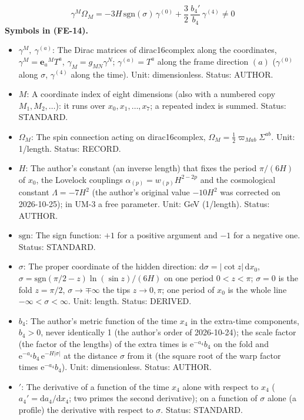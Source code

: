 \documentclass[
  10pt,
]{article}
\providecommand{\tightlist}{%
  \setlength{\itemsep}{0pt}\setlength{\parskip}{0pt}}
\begin{document}
\[
\gamma^M\Omega_M = -3H\,\mathrm{sgn}(\sigma)\,\gamma^{(0)} + \frac32\,\frac{b_4'}{b_4}\,\gamma^{(4)} \ne 0 \tag{FE-14}
\] \textbf{Symbols in (FE-14).}

\begin{itemize}
\tightlist
\item
  \(\gamma^M,\ \gamma^{(a)}\): The Dirac matrices of dirac16complex
  along the coordinates, \(\gamma^M = \mathbf{e}_a{}^MT^a\),
  \(\gamma_M = g_{MN}\gamma^N\); \(\gamma^{(a)} = T^a\) along the frame
  direction \((a)\) (\(\gamma^{(0)}\) along \(\sigma\), \(\gamma^{(4)}\)
  along the time). Unit: dimensionless. Status: AUTHOR.
\item
  \(M\): A coordinate index of eight dimensions (also with a numbered
  copy \(M_1, M_2, \dots\)): it runs over \(x_0, x_1, \dots, x_7\); a
  repeated index is summed. Status: STANDARD.
\item
  \(\Omega_M\): The spin connection acting on dirac16complex,
  \(\Omega_M = \frac12\varpi_{Mab}\Sigma^{ab}\). Unit: 1/length. Status:
  RECORD.
\item
  \(H\): The author's constant (an inverse length) that fixes the period
  \(\pi/(6H)\) of \(x_0\), the Lovelock couplings
  \(\alpha_{(p)} = w_{(p)}H^{2-2p}\) and the cosmological constant
  \(\Lambda = -7H^2\) (the author's original value \(-10H^2\) was
  corrected on 2026-10-25); in UM-3 a free parameter. Unit: GeV
  (1/length). Status: AUTHOR.
\item
  \(\mathrm{sgn}\): The sign function: \(+1\) for a positive argument
  and \(-1\) for a negative one. Status: STANDARD.
\item
  \(\sigma\): The proper coordinate of the hidden direction:
  \(\mathrm{d}\sigma = \lvert\cot z\rvert\,\mathrm{d}x_0\),
  \(\sigma = \mathrm{sgn}(\pi/2 - z)\ln(\sin z)/(6H)\) on one period
  \(0 < z < \pi\); \(\sigma = 0\) is the fold \(z = \pi/2\),
  \(\sigma \to \mp\infty\) the tips \(z \to 0, \pi\); one period of
  \(x_0\) is the whole line \(-\infty < \sigma < \infty\). Unit: length.
  Status: DERIVED.
\item
  \(b_4\): The author's metric function of the time \(x_4\) in the
  extra-time components, \(b_4 > 0\), never identically 1 (the author's
  order of 2026-10-24); the scale factor (the factor of the lengths) of
  the extra times is \(\mathrm{e}^{-a_4}b_4\) on the fold and
  \(\mathrm{e}^{-a_4}b_4\,\mathrm{e}^{-H\lvert\sigma\rvert}\) at the
  distance \(\sigma\) from it (the square root of the warp factor times
  \(\mathrm{e}^{-a_4}b_4\)). Unit: dimensionless. Status: AUTHOR.
\item
  \({}'\): The derivative of a function of the time \(x_4\) alone with
  respect to \(x_4\) (\(a_4' = \mathrm{d}a_4/\mathrm{d}x_4\); two primes
  the second derivative); on a function of \(\sigma\) alone (a profile)
  the derivative with respect to \(\sigma\). Status: STANDARD.
\end{itemize}
\end{document}
